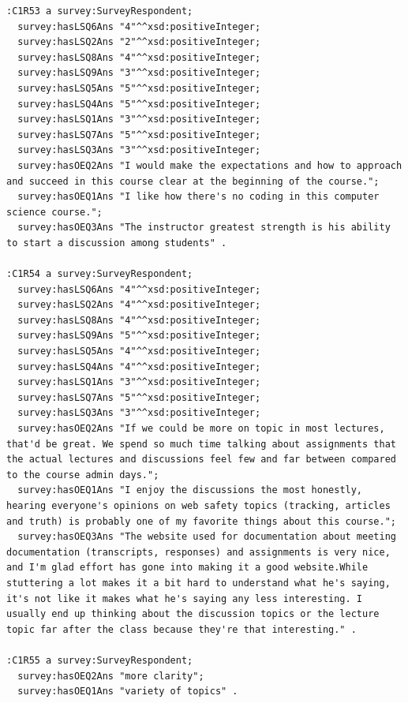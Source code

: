 \begin{lstlisting}
:C1R53 a survey:SurveyRespondent;
  survey:hasLSQ6Ans "4"^^xsd:positiveInteger;
  survey:hasLSQ2Ans "2"^^xsd:positiveInteger;
  survey:hasLSQ8Ans "4"^^xsd:positiveInteger;
  survey:hasLSQ9Ans "3"^^xsd:positiveInteger;
  survey:hasLSQ5Ans "5"^^xsd:positiveInteger;
  survey:hasLSQ4Ans "5"^^xsd:positiveInteger;
  survey:hasLSQ1Ans "3"^^xsd:positiveInteger;
  survey:hasLSQ7Ans "5"^^xsd:positiveInteger;
  survey:hasLSQ3Ans "3"^^xsd:positiveInteger;
  survey:hasOEQ2Ans "I would make the expectations and how to approach and succeed in this course clear at the beginning of the course.";
  survey:hasOEQ1Ans "I like how there's no coding in this computer science course.";
  survey:hasOEQ3Ans "The instructor greatest strength is his ability to start a discussion among students" .

:C1R54 a survey:SurveyRespondent;
  survey:hasLSQ6Ans "4"^^xsd:positiveInteger;
  survey:hasLSQ2Ans "4"^^xsd:positiveInteger;
  survey:hasLSQ8Ans "4"^^xsd:positiveInteger;
  survey:hasLSQ9Ans "5"^^xsd:positiveInteger;
  survey:hasLSQ5Ans "4"^^xsd:positiveInteger;
  survey:hasLSQ4Ans "4"^^xsd:positiveInteger;
  survey:hasLSQ1Ans "3"^^xsd:positiveInteger;
  survey:hasLSQ7Ans "5"^^xsd:positiveInteger;
  survey:hasLSQ3Ans "3"^^xsd:positiveInteger;
  survey:hasOEQ2Ans "If we could be more on topic in most lectures, that'd be great. We spend so much time talking about assignments that the actual lectures and discussions feel few and far between compared to the course admin days.";
  survey:hasOEQ1Ans "I enjoy the discussions the most honestly, hearing everyone's opinions on web safety topics (tracking, articles and truth) is probably one of my favorite things about this course.";
  survey:hasOEQ3Ans "The website used for documentation about meeting documentation (transcripts, responses) and assignments is very nice, and I'm glad effort has gone into making it a good website.While stuttering a lot makes it a bit hard to understand what he's saying, it's not like it makes what he's saying any less interesting. I usually end up thinking about the discussion topics or the lecture topic far after the class because they're that interesting." .

:C1R55 a survey:SurveyRespondent;
  survey:hasOEQ2Ans "more clarity";
  survey:hasOEQ1Ans "variety of topics" .


\end{lstlisting}
